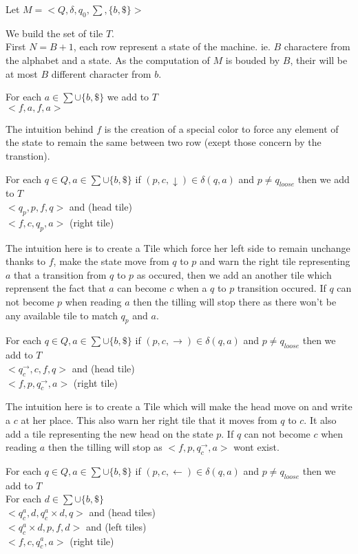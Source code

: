 Let $M = <Q,\delta,q_0,\sum,\{b,\$\}>$

We build the set of tile $T$. 
\\First $N= B+1$, each row represent a state of the machine. ie. $B$ charactere from the alphabet and a state. As the computation of $M$ is bouded by $B$, their will be at most $B$  different character from $b$.


For each $a \in \sum \cup \{b,\$\}$ we add to $T$
\\$<f,a,f,a>$

The intuition behind $f$ is the creation of a special color to force any element of the state to remain the same between two row (exept those concern by the transtion).

For each $q \in Q, a \in \sum\cup \{b,\$\}$ if $(p,c,\downarrow) \in \delta (q,a)$ and $p\neq q_{loose}$ then we add to $T$
\\$<q_p,p,f ,q>$ and (head tile)
\\$<f,c,q_p,a>$ (right tile)

The intuition here is to create a Tile which force her left side to remain unchange thanks to $f$, make the state move from $q$ to $p$ and warn the right tile representing $a$ that a transition from $q$ to $p$ as occured, then we add an another tile which reprensent the fact that $a$ can become $c$ when a  $q$ to $p$ transition occured.
If $q$ can not become $p$ when reading $a$ then the tilling will stop there as there won't be any available tile to match $q_p$ and $a$.

For each $q \in Q, a \in \sum\cup \{b,\$\}$ if $(p,c,\rightarrow) \in \delta (q,a)$ and $p\neq q_{loose}$ then we add to $T$
\\$<q_c^{\rightarrow},c, f,q>$ and  (head tile)
\\$<f,p,q_c^{\rightarrow},a>$ (right tile)

The intuition here is to create a Tile which will make the head move on and write a $c$ at her place. This also warn her right tile that it moves from $q$ to $c$.
It also add a tile representing the new head on the state $p$.
If $q$ can not become $c$ when reading $a$ then the tilling will stop as $<f,p,q_c^{\rightarrow},a>$ wont exist.


For each $q \in Q, a \in \sum\cup \{b,\$\}$ if $(p,c,\leftarrow) \in \delta (q,a)$ and $p\neq q_{loose}$ then we add to $T$
\\For each $d \in \sum\cup \{b,\$\}$
\\$<q_c^a,d,q_c^a\times d,q>$ and (head tiles)
\\$<q_c^a\times d,p,f,d>$ and (left tiles)
\\$<f,c,q_c^a,a>$ (right tile)

